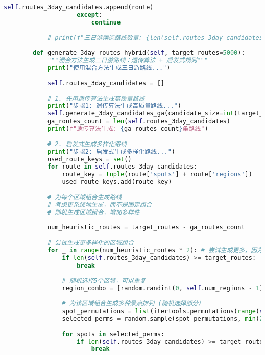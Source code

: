 \begin{lstlisting}[language=Python]
                        self.routes_3day_candidates.append(route)
                    except:
                        continue
            
            # print(f"三日游候选路线数量: {len(self.routes_3day_candidates)}") # 避免过多打印
        
        def generate_3day_routes_hybrid(self, target_routes=5000):
            """混合方法生成三日游路线：遗传算法 + 启发式规则"""
            print("使用混合方法生成三日游路线...")
            
            self.routes_3day_candidates = []
            
            # 1. 先用遗传算法生成高质量路线
            print("步骤1: 遗传算法生成高质量路线...")
            self.generate_3day_candidates_ga(candidate_size=int(target_routes * 0.1), population_size=1000, generations=50) # 减少GA生成的比例
            ga_routes_count = len(self.routes_3day_candidates)
            print(f"遗传算法生成: {ga_routes_count}条路线")
            
            # 2. 启发式生成多样化路线
            print("步骤2: 启发式生成多样化路线...")
            used_route_keys = set()
            for route in self.routes_3day_candidates:
                route_key = tuple(route['spots'] + route['regions'])
                used_route_keys.add(route_key)
            
            # 为每个区域组合生成路线
            # 考虑更系统地生成，而不是固定组合
            # 随机生成区域组合，增加多样性
            
            num_heuristic_routes = target_routes - ga_routes_count
            
            # 尝试生成更多样化的区域组合
            for _ in range(num_heuristic_routes * 2): # 尝试生成更多，因为会有重复或无效
                if len(self.routes_3day_candidates) >= target_routes:
                    break
                
                # 随机选择5个区域，可以重复
                region_combo = [random.randint(0, self.num_regions - 1) for _ in range(5)]
                
                # 为该区域组合生成多种景点排列 (随机选择部分)
                spot_permutations = list(itertools.permutations(range(self.num_spots)))
                selected_perms = random.sample(spot_permutations, min(2, len(spot_permutations))) # 减少每个区域组合的景点排列数
                
                for spots in selected_perms:
                    if len(self.routes_3day_candidates) >= target_routes:
                        break
                        

\end{lstlisting}
